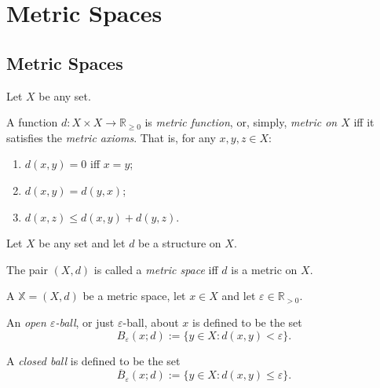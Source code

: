 \tableofcontents


\chapter{Metric Spaces}


\section{Metric Spaces}



\begin{definition}
	\label{def: metric axioms}
	Let $X$ be any set.
	
	A function $d: X \times X \to \mathbb R_{\ge 0}$ is \textit{metric function}, or, simply, \textit{metric on $X$} iff it satisfies the \textit{metric axioms}. That is, for any $x, y, z \in X$:
	\begin{enumerate}[\bf M1. ]
		\item $d(x,y) = 0$ iff $x = y$;
		\item $d(x,y) = d(y,x)$;
		\item $d(x, z) \le d(x,y) + d(y,z)$.
	\end{enumerate}
\end{definition}


\begin{definition}
	\label{def: metric space}
	Let $X$ be any set and let $d$ be a structure on $X$.
	
	The pair $(X, d)$ is called a \textit{metric space} iff $d$ is a metric on $X$.
\end{definition}


\begin{definition}
	\label{def: ball}
	A $\mathbb X = (X, d)$ be a metric space, let $x \in X$ and let $\varepsilon \in \mathbb R_{> 0}$.
	
	An \textit{open $\varepsilon$-ball}, or just $\varepsilon$-ball, about $x$ is defined to be the set
	$$
	B_\varepsilon (x; d) := \{ y \in X : d(x,y) < \varepsilon \}.
	$$
	
	A \textit{closed ball} is defined to be the set
	$$
	\overline{B}_\varepsilon (x; d) := \{ y \in X : d(x,y) \le \varepsilon \}.
	$$
\end{definition}


